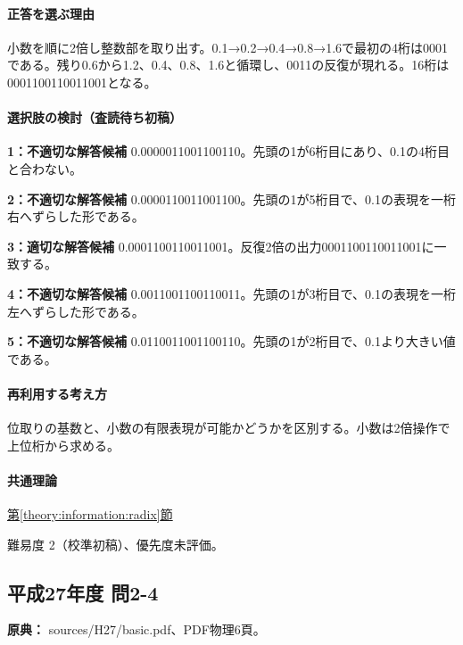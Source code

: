 \paragraph{正答を選ぶ理由} 小数を順に2倍し整数部を取り出す。0.1→0.2→0.4→0.8→1.6で最初の4桁は0001である。残り0.6から1.2、0.4、0.8、1.6と循環し、0011の反復が現れる。16桁は0001100110011001となる。

\paragraph{選択肢の検討（査読待ち初稿）}

\noindent\textbf{1：不適切な解答候補} 0.0000011001100110。先頭の1が6桁目にあり、0.1の4桁目と合わない。\par

\noindent\textbf{2：不適切な解答候補} 0.0000110011001100。先頭の1が5桁目で、0.1の表現を一桁右へずらした形である。\par

\noindent\textbf{3：適切な解答候補} 0.0001100110011001。反復2倍の出力0001100110011001に一致する。\par

\noindent\textbf{4：不適切な解答候補} 0.0011001100110011。先頭の1が3桁目で、0.1の表現を一桁左へずらした形である。\par

\noindent\textbf{5：不適切な解答候補} 0.0110011001100110。先頭の1が2桁目で、0.1より大きい値である。\par

\paragraph{再利用する考え方} 位取りの基数と、小数の有限表現が可能かどうかを区別する。小数は2倍操作で上位桁から求める。

\paragraph{共通理論} \hyperref[theory:information:radix]{第\ref*{theory:information:radix}節}

\par 難易度 2（校準初稿）、優先度未評価。

\subsection{平成27年度 問2-4}
\label{q:h27-reg-basic-2-4}

\noindent\textbf{原典：} sources/H27/basic.pdf、PDF物理6頁。

